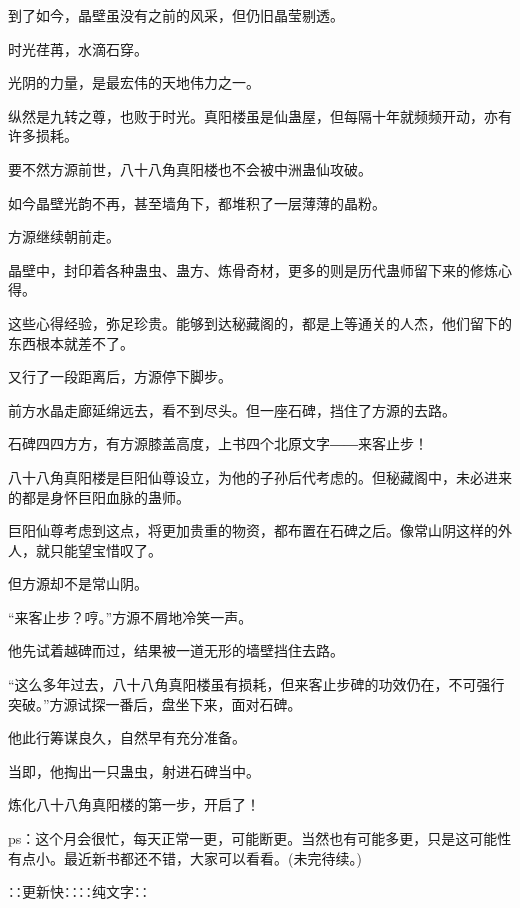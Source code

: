 \begin{this_body}
到了如今，晶壁虽没有之前的风采，但仍旧晶莹剔透。

时光荏苒，水滴石穿。

光阴的力量，是最宏伟的天地伟力之一。

纵然是九转之尊，也败于时光。真阳楼虽是仙蛊屋，但每隔十年就频频开动，亦有许多损耗。

要不然方源前世，八十八角真阳楼也不会被中洲蛊仙攻破。

如今晶壁光韵不再，甚至墙角下，都堆积了一层薄薄的晶粉。

方源继续朝前走。

晶壁中，封印着各种蛊虫、蛊方、炼骨奇材，更多的则是历代蛊师留下来的修炼心得。

这些心得经验，弥足珍贵。能够到达秘藏阁的，都是上等通关的人杰，他们留下的东西根本就差不了。

又行了一段距离后，方源停下脚步。

前方水晶走廊延绵远去，看不到尽头。但一座石碑，挡住了方源的去路。

石碑四四方方，有方源膝盖高度，上书四个北原文字――来客止步！

八十八角真阳楼是巨阳仙尊设立，为他的子孙后代考虑的。但秘藏阁中，未必进来的都是身怀巨阳血脉的蛊师。

巨阳仙尊考虑到这点，将更加贵重的物资，都布置在石碑之后。像常山阴这样的外人，就只能望宝惜叹了。

但方源却不是常山阴。

“来客止步？哼。”方源不屑地冷笑一声。

他先试着越碑而过，结果被一道无形的墙壁挡住去路。

“这么多年过去，八十八角真阳楼虽有损耗，但来客止步碑的功效仍在，不可强行突破。”方源试探一番后，盘坐下来，面对石碑。

他此行筹谋良久，自然早有充分准备。

当即，他掏出一只蛊虫，射进石碑当中。

炼化八十八角真阳楼的第一步，开启了！

ps：这个月会很忙，每天正常一更，可能断更。当然也有可能多更，只是这可能性有点小。最近新书都还不错，大家可以看看。(未完待续。)

∷更新快∷∷纯文字∷

\end{this_body}

